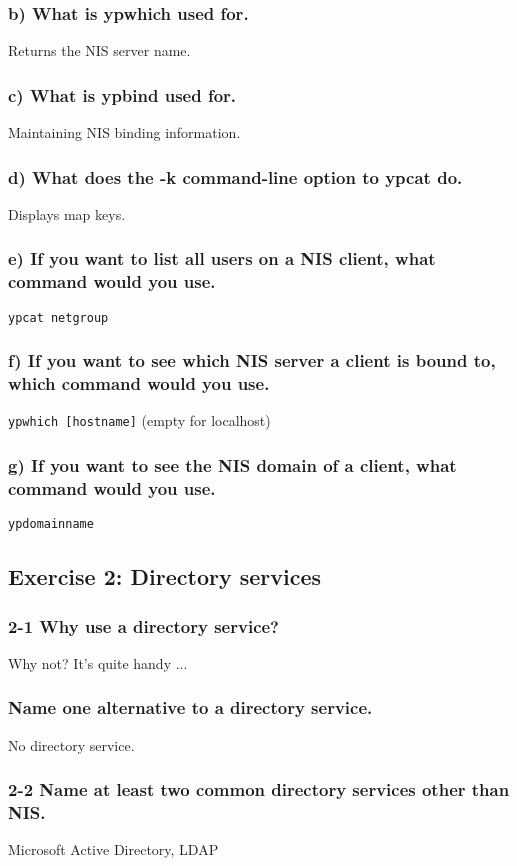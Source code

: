 \subsubsection{b) What is ypwhich used for.}
Returns the NIS server name.

\subsubsection{c) What is ypbind used for.}
Maintaining NIS binding information.

\subsubsection{d) What does the -k command-line option to ypcat do.}
Displays map keys.

\subsubsection{e) If you want to list all users on a NIS client, what command would you use.}
\verb=ypcat netgroup= %

\subsubsection{f) If you want to see which NIS server a client is bound to, which command would you use.}
\verb=ypwhich [hostname]= (empty for localhost)

\subsubsection{g) If you want to see the NIS domain of a client, what command would you use.}
\verb=ypdomainname= %


\subsection{Exercise 2: Directory services}
\subsubsection{2-1 Why use a directory service?}
Why not? It's quite handy ...

\subsubsection{ Name one alternative to a directory service.}
No directory service.

\subsubsection{2-2 Name at least two common directory services other than NIS.}
Microsoft Active Directory, LDAP


